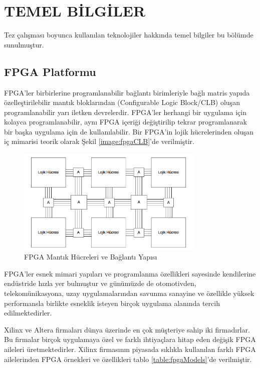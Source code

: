 \chapter{TEMEL BİLGİLER} \label{chapter:temelBilgiler}
Tez çalışması boyunca kullanılan teknolojiler hakkında temel bilgiler bu bölümde sunulmuştur.
\section{FPGA Platformu}
FPGA'ler birbirlerine programlanabilir bağlantı birimleriyle bağlı matris yapıda özelleştirilebilir mantık bloklarından (Configurable Logic Block/CLB) oluşan programlanabilir yarı iletken devrelerdir. FPGA’ler herhangi bir uygulama için kolayca programlanabilir, aynı FPGA içeriği değiştirilip tekrar programlanarak bir başka uygulama için de kullanılabilir. Bir FPGA’in lojik hücrelerinden oluşan iç mimarisi teorik olarak Şekil \ref{image:fpgaCLB}’de verilmiştir.\par
\begin{figure}[ht]
\centering
\shorthandoff{=}
\includegraphics[width=0.8\textwidth]{gorsel/fpgaCLB.png}
\shorthandoff{=}
\caption{FPGA Mantık Hücreleri ve Bağlantı Yapısı}
\label{fpgaCLB}
\end{figure}

FPGA'ler esnek mimari yapıları ve programlanma özellikleri sayesinde kendilerine endüstride hızla yer bulmuştur ve günümüzde de otomotivden, telekomünikasyona, uzay uygulamalarından savunma sanayine ve özellikle yüksek performansla birlikte esneklik isteyen birçok uygulama alanında tercih edilmektedirler. \cite{aykenarThesis} \par

Xilinx ve Altera firmaları dünya üzerinde en çok müşteriye sahip iki firmadırlar. Bu firmalar birçok uygulamaya özel ve farklı ihtiyaçlara hitap eden değişik FPGA aileleri üretmektedirler. Xilinx firmasının piyasada sıklıkla kullanılan farklı FPGA ailelerinden FPGA örnekleri ve özellikleri tablo \ref{table:fpgaModels}’de verilmiştir.\par

